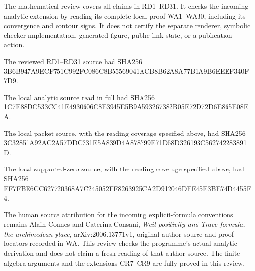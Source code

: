 \documentclass[
]{article}
\begin{document}
The mathematical review covers all claims in RD1--RD31. It checks the
incoming analytic extension by reading its complete local proof
WA1--WA30, including its convergence and contour signs. It does not
certify the separate renderer, symbolic checker implementation,
generated figure, public link state, or a publication action.

The reviewed RD1--RD31 source had SHA256
3B6B947A9ECF751C992FC086C8B55569041ACB8B62A8A77B1A9B6EEEF340F7D9.

The local analytic source read in full had SHA256
1C7E88DC533CC41E4930606C8E3945E5B9A593267382B05E72D72D6E865E08EA.

The local packet source, with the reading coverage specified above, had
SHA256 3C32851A92AC2A57DDC331E5A839D4A878799E71D58D326193C562742283891D.

The local supported-zero source, with the reading coverage specified
above, had SHA256
FF7FBE6CC627720368A7C245052EF8263925CA2D912046DFE45E3BE74D4455F4.

The human source attribution for the incoming explicit-formula
conventions remains Alain Connes and Caterina Consani, \emph{Weil
positivity and Trace formula, the archimedean place},
arXiv:2006.13771v1, original author source and proof locators recorded
in WA. This review checks the programme's actual analytic derivation and
does not claim a fresh reading of that author source. The finite algebra
arguments and the extensions CR7--CR9 are fully proved in this review.
\end{document}
